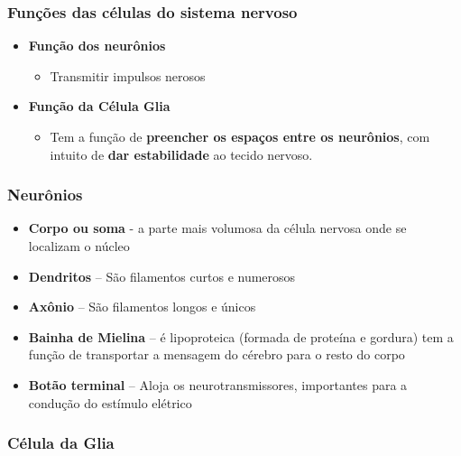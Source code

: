 \documentclass[
]{book}
\providecommand{\tightlist}{%
  \setlength{\itemsep}{0pt}\setlength{\parskip}{0pt}}
\begin{document}
\hypertarget{funuxe7uxf5es-das-cuxe9lulas-do-sistema-nervoso}{%
\subsubsection{Funções das células do sistema nervoso}\label{funuxe7uxf5es-das-cuxe9lulas-do-sistema-nervoso}}

\begin{itemize}
\tightlist
\item
  \textbf{Função dos neurônios}

  \begin{itemize}
  \tightlist
  \item
    Transmitir impulsos nerosos
  \end{itemize}
\item
  \textbf{Função da Célula Glia}

  \begin{itemize}
  \tightlist
  \item
    Tem a função de \textbf{preencher os espaços entre os neurônios}, com intuito de \textbf{dar estabilidade} ao tecido nervoso.
  \end{itemize}
\end{itemize}

\hypertarget{neuruxf4nios}{%
\subsubsection{Neurônios}\label{neuruxf4nios}}

\begin{itemize}
\tightlist
\item
  \textbf{Corpo ou soma} - a parte mais volumosa da célula nervosa onde se localizam o núcleo
\item
  \textbf{Dendritos} -- São filamentos curtos e numerosos
\item
  \textbf{Axônio} -- São filamentos longos e únicos
\item
  \textbf{Bainha de Mielina} -- é lipoproteica (formada de proteína e gordura) tem a função de transportar a mensagem do cérebro para o resto do corpo
\item
  \textbf{Botão terminal} -- Aloja os neurotransmissores, importantes para a condução do estímulo elétrico
\end{itemize}

\hypertarget{cuxe9lula-da-glia}{%
\subsubsection{Célula da Glia}\label{cuxe9lula-da-glia}}
\end{document}
